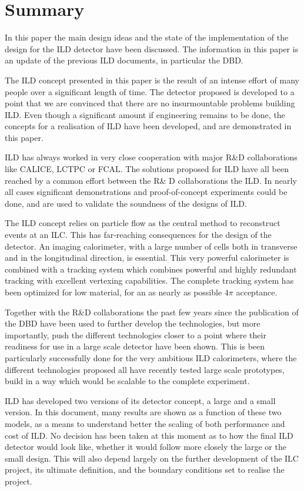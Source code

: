 \chapter{Summary}

In this paper the main design ideas and the state of the implementation of the design for the ILD detector have been discussed. The information in this paper is an update of the previous ILD documents, in particular the DBD. 

The ILD concept presented in this paper is the result of an intense effort of many people over a significant length of time. The detector proposed is developed to a point that we are convinced that there are no insurmountable problems building ILD. Even though a significant amount if engineering remains to be done, the concepts for a realisation of ILD have been developed, and are demonstrated in this paper. 

ILD has always worked in very close cooperation with major R\&D collaborations like CALICE, LCTPC or FCAL. The solutions proposed for ILD have all been reached by a common effort between the R\& D collaborations the ILD. In nearly all cases significant demonstrations and proof-of-concept experiments could be done, and are used to validate the soundness of the designs of ILD. 

The ILD concept relies on particle flow as the central method to reconstruct events at an ILC. This has far-reaching consequences for the design of the detector. An imaging calorimeter, with a large number of cells both in transverse and in the longitudinal direction, is essential. This very powerful calorimeter is combined with a tracking system which combines powerful and highly redundant tracking with excellent vertexing capabilities. The complete tracking system has been optimized for low material, for an as nearly as possible $4 \pi$ acceptance.

Together with the R\&D collaborations the past few years since the publication of the DBD have been used to further develop the technologies, but more importantly, push the different technologies closer to a point where their readiness for use in a large scale detector have been shown. This is been particularly successfully done for the very ambitious ILD calorimeters, where the different technologies proposed all have recently tested large scale prototypes, build in a way which would be scalable to the complete experiment. 

ILD has developed two versions of its detector concept, a large and a small version. In this document, many results are shown as a function of these two models, as a means to understand better the scaling of both performance and cost of ILD. No decision has been taken at this moment as to how the final ILD detector would look like, whether it would follow more closely the large or the small design. This will also depend largely on the further development of the ILC project, its ultimate definition, and the boundary conditions set to realise the project. 


